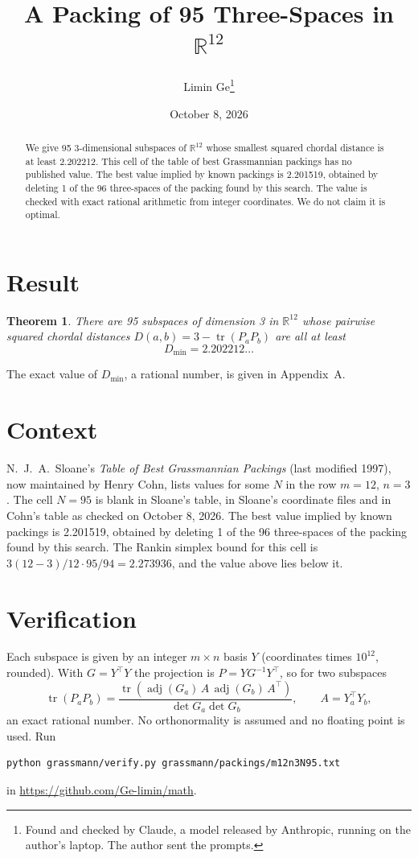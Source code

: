 \documentclass[11pt,a4paper]{article}
\title{A Packing of 95 Three-Spaces in $\mathbb{R}^{12}$}
\author{Limin Ge\thanks{Found and checked by Claude, a model released by Anthropic, running on the author's laptop. The author sent the prompts.}}
\date{October 8, 2026}
\newtheorem*{theorem}{Theorem}
\begin{document}
\maketitle
\begin{abstract}
We give 95 3-dimensional subspaces of $\mathbb{R}^{12}$ whose smallest squared chordal distance is at least 2.202212. This cell of the table of best Grassmannian packings has no published value. The best value implied by known packings is 2.201519, obtained by deleting 1 of the 96 three-spaces of the packing found by this search. The value is checked with exact rational arithmetic from integer coordinates. We do not claim it is optimal.
\end{abstract}

\section{Result}
\begin{theorem}
There are 95 subspaces of dimension 3 in $\mathbb{R}^{12}$ whose pairwise squared chordal distances $D(a,b) = 3 - \operatorname{tr}(P_aP_b)$ are all at least
\[ D_{\min} = 2.202212\ldots \]
\end{theorem}
The exact value of $D_{\min}$, a rational number, is given in Appendix~A.


\section{Context}
N.~J.~A.~Sloane's \emph{Table of Best Grassmannian Packings} (last modified 1997), now maintained by Henry Cohn, lists values for some $N$ in the row $m=12$, $n=3$. The cell $N=95$ is blank in Sloane's table, in Sloane's coordinate files and in Cohn's table as checked on October 8, 2026. The best value implied by known packings is 2.201519, obtained by deleting 1 of the 96 three-spaces of the packing found by this search. The Rankin simplex bound for this cell is $3(12-3)/12\cdot 95/94 = 2.273936$, and the value above lies below it.


\section{Verification}
Each subspace is given by an integer $m\times n$ basis $Y$ (coordinates times $10^{12}$, rounded). With $G=Y^\top Y$ the projection is $P=YG^{-1}Y^\top$, so for two subspaces
\[ \operatorname{tr}(P_aP_b)=\frac{\operatorname{tr}(\operatorname{adj}(G_a)\,A\,\operatorname{adj}(G_b)\,A^\top)}{\det G_a\det G_b},\qquad A=Y_a^\top Y_b, \]
an exact rational number. No orthonormality is assumed and no floating point is used. Run
\begin{verbatim}
python grassmann/verify.py grassmann/packings/m12n3N95.txt
\end{verbatim}
in \url{https://github.com/Ge-limin/math}.
\end{document}
